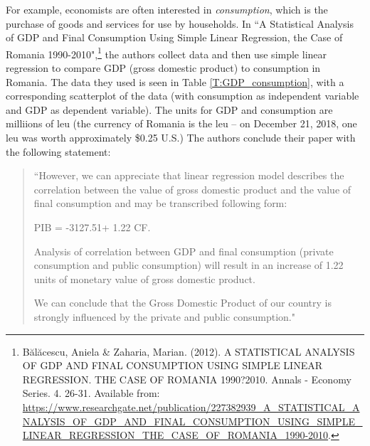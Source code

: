 For example, economists are often interested in \emph{consumption}, which is the purchase of goods and services for use by households. In ``A Statistical Analysis of GDP and Final Consumption Using Simple Linear Regression, the Case of Romania 1990-2010",\footnote{B\u{a}l\u{a}cescu, Aniela \& Zaharia, Marian. (2012). A STATISTICAL ANALYSIS OF GDP AND FINAL CONSUMPTION USING SIMPLE LINEAR REGRESSION. THE CASE OF ROMANIA 1990?2010. Annals - Economy Series. 4. 26-31. Available from: \url{https://www.researchgate.net/publication/227382939_A_STATISTICAL_ANALYSIS_OF_GDP_AND_FINAL_CONSUMPTION_USING_SIMPLE_LINEAR_REGRESSION_THE_CASE_OF_ROMANIA_1990-2010}.} the authors collect data and then use simple linear regression to compare GDP (gross domestic product) to consumption in Romania. The data they used is seen in Table \ref{T:GDP_consumption}, with a corresponding scatterplot of the data (with consumption as independent variable and GDP as dependent variable). The units for GDP and consumption are milliions of leu (the currency of Romania is the leu -- on December 21, 2018, one leu was worth approximately \$0.25 U.S.)
The authors conclude their paper with the following statement: 
\begin{quote}
``However, we can appreciate that linear regression model describes the correlation between the value of gross domestic product and the value of final consumption and may be transcribed following form: 
\begin{center} PIB = -3127.51+ 1.22 CF. \end{center}

Analysis of correlation between GDP and final consumption (private consumption and public consumption) will result in an increase of 1.22 units of monetary value of gross domestic product. 
 
We can conclude that the Gross Domestic Product of our country is strongly influenced by the private and public consumption."
 \end{quote}


